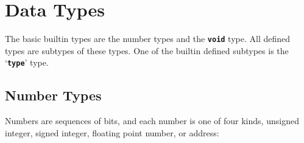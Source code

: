 \documentclass[12pt]{article}
\newcommand{\TT}[1]{{\tt \bfseries #1}}
\begin{document}
\section{Data Types}
\label{DATA-TYPES-TYPES}

The basic builtin types are the number types and the \TT{void} type.
All defined types are subtypes of these types.
One of the builtin defined subtypes is the `\TT{type}' type.

\subsection{Number Types}
\label{NUMBER-TYPES}

Numbers are sequences of bits, and each number is one of
four kinds, unsigned integer, signed integer, floating point number,
or address:
\end{document}
